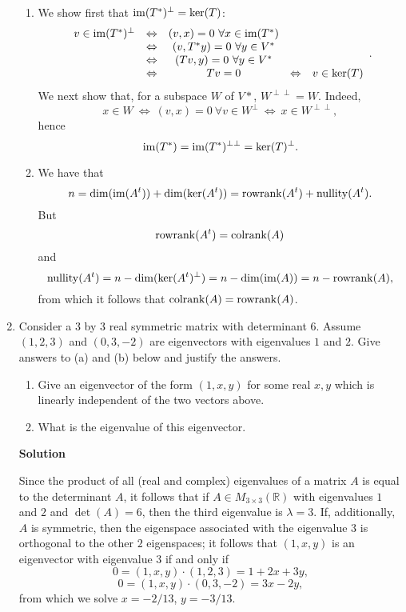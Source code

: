 \documentclass{article}
\def\dim{\mathop{\rm dim}\nolimits}
\def\im{\mathop{\rm im}\nolimits}
\def\ker{\mathop{\rm ker}\nolimits}
\def\rowrank{\mathop{\rm rowrank}\nolimits}
\def\colrank{\mathop{\rm colrank}\nolimits}
\def\nullity{\mathop{\rm nullity}\nolimits}
\begin{document}
\begin{enumerate}
\begin{enumerate}
\item We show first that \(\im(T^*)^{\perp} = \ker(T)\):
\[\begin{array}{*{5}{c}}
  v \in \im(T^*)^{\perp}
  & \Leftrightarrow & (v,x) = 0 \ \forall x \in \im(T^*) & & \\
  & \Leftrightarrow & (v,T^*y) = 0 \ \forall y \in V^* & & \\
  & \Leftrightarrow & (Tv,y) = 0 \ \forall y \in V^* & & \\
  & \Leftrightarrow & Tv = 0
  & \Leftrightarrow & v \in \ker(T)
  \end{array}.\]
We next show that, for a subspace \(W\) of \(V*\), \(W^{\perp\perp} = W\).  Indeed,
\[x \in W \ \Leftrightarrow \ (v,x) = 0 \ \forall v \in W^{\perp}
          \ \Leftrightarrow \ x \in W^{\perp\perp},\]
hence
\[\im(T^*) = \im(T^*)^{\perp\perp} = \ker(T)^{\perp}.\]

\item We have that
\[n = \dim(\im(A^t)) + \dim(\ker(A^t)) = \rowrank(A^t) + \nullity(A^t).\]
But
\[\rowrank(A^t) = \colrank(A)\]
and
\[\nullity(A^t) = n - \dim(\ker(A^t)^{\perp}) = n - \dim(\im(A)) = n - \rowrank(A),\]
from which it follows that \(\colrank(A) = \rowrank(A)\).

\end{enumerate}



\item Consider a \(3\) by \(3\) real symmetric matrix with determinant \(6\).  Assume \((1,2,3)\) and \((0,3,-2)\) are eigenvectors with eigenvalues \(1\) and \(2\).  Give answers to (a) and (b) below and justify the answers.

\begin{enumerate}
\item Give an eigenvector of the form \((1,x,y)\) for some real \(x,y\) which is linearly independent of the two vectors above.

\item What is the eigenvalue of this eigenvector.

\end{enumerate}

{\bf Solution}

Since the product of all (real and complex) eigenvalues of a matrix \(A\) is equal to the determinant \(A\), it follows that if \(A \in M_{3 \times 3}(\mathbb{R})\) with eigenvalues \(1\) and \(2\) and \(\det(A) = 6\), then the third eigenvalue is \(\lambda = 3\).  If, additionally, \(A\) is symmetric, then the eigenspace associated with the eigenvalue \(3\) is orthogonal to the other \(2\) eigenspaces; it follows that \((1,x,y)\) is an eigenvector with eigenvalue \(3\) if and only if
\[0 = (1,x,y) \cdot (1,2,3) = 1 + 2x + 3y,\]
\[0 = (1,x,y) \cdot (0,3,-2) = 3x - 2y,\]
from which we solve \(x = -2/13\), \(y = -3/13\).




\end{enumerate}
\end{document}
